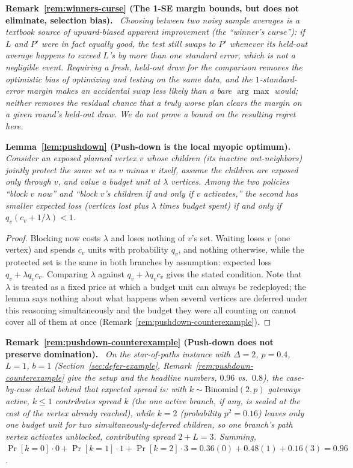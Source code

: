 \documentclass[11pt]{article}
\theoremstyle{definition}
\theoremstyle{remark}
\newenvironment{repeatlemma}[1][]{\par\medskip\noindent\textbf{#1.}\ \itshape}{\par\medskip}
\newenvironment{repeatremark}[1][]{\par\medskip\noindent\textbf{#1.}\ \itshape}{\par\medskip}
\begin{document}
\begin{repeatremark}[Remark~\ref{rem:winners-curse} (The 1-SE margin bounds, but does not eliminate, selection bias)]
Choosing between two noisy sample averages is a textbook source of
upward-biased apparent improvement (the ``winner's curse''): if $L$ and
$P'$ were in fact equally good, the test still swaps to $P'$ whenever its
held-out average happens to exceed $L$'s by more than one standard error,
which is not a negligible event. Requiring a fresh, held-out draw for the
comparison removes the optimistic bias of optimizing and testing on the
same data, and the $1$-standard-error margin makes an accidental swap less
likely than a bare $\arg\max$ would; neither removes the residual chance
that a truly worse plan clears the margin on a given round's held-out
draw. We do not prove a bound on the resulting regret here.
\end{repeatremark}

\begin{repeatlemma}[Lemma~\ref{lem:pushdown} (Push-down is the local myopic optimum)]
Consider an exposed planned vertex $v$ whose children (its inactive
out-neighbors) jointly protect the same set as $v$ minus $v$ itself, assume
the children are exposed only through $v$, and value a budget unit at
$\lambda$ vertices. Among the two policies ``block $v$ now'' and ``block
$v$'s children if and only if $v$ activates,'' the second has smaller
expected loss (vertices lost plus $\lambda$ times budget spent) if and only
if $q_v(c_v+1/\lambda)<1$.
\end{repeatlemma}
\begin{proof}
Blocking now costs $\lambda$ and loses nothing of $v$'s set. Waiting loses
$v$ (one vertex) and spends $c_v$ units with probability $q_v$, and nothing
otherwise, while the protected set is the same in both branches by
assumption: expected loss $q_v+\lambda q_v c_v$. Comparing $\lambda$ against
$q_v+\lambda q_v c_v$ gives the stated condition. Note that $\lambda$ is
treated as a fixed price at which a budget unit can always be redeployed;
the lemma says nothing about what happens when several vertices are
deferred under this reasoning simultaneously and the budget they were all
counting on cannot cover all of them at once
(Remark~\ref{rem:pushdown-counterexample}).
\end{proof}

\begin{repeatremark}[Remark~\ref{rem:pushdown-counterexample} (Push-down does not preserve domination)]
On the star-of-paths instance with $\Delta=2$, $p=0.4$, $L=1$, $b=1$
(Section~\ref{sec:defer-example}, Remark~\ref{rem:pushdown-counterexample}
give the setup and the headline numbers, $0.96$ vs.\ $0.8$), the
case-by-case detail behind that expected spread is: with
$k\sim\mathrm{Binomial}(2,p)$ gateways active, $k\le1$ contributes spread
$k$ (the one active branch, if any, is sealed at the cost of the vertex
already reached), while $k=2$ (probability $p^2=0.16$) leaves only one
budget unit for two simultaneously-deferred children, so one branch's
path vertex activates unblocked, contributing spread $2+L=3$. Summing,
$\Pr[k{=}0]\cdot0+\Pr[k{=}1]\cdot1+\Pr[k{=}2]\cdot3=0.36(0)+0.48(1)+0.16(3)=0.96$.
\end{repeatremark}
\end{document}
